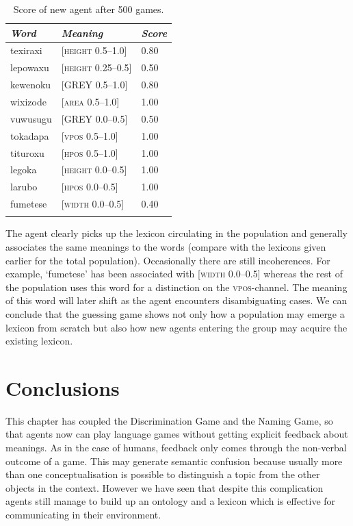 \begin{table}
\begin{center}
\begin{tabular}{ l  l  l }
\lsptoprule
{\itshape Word} & {\itshape Meaning} & {\itshape Score} \\ \midrule
texiraxi &  [\textsc{height} 0.5–1.0] & 0.80 \\ 
lepowaxu &  [\textsc{height} 0.25–0.5] & 0.50 \\ 
kewenoku &  [GREY 0.5–1.0] & 0.80 \\ 
wixizode & [\textsc{area} 0.5–1.0] & 1.00 \\ 
vuwusugu & [GREY 0.0–0.5] & 0.50 \\ 
tokadapa &  [\textsc{vpos} 0.5–1.0] & 1.00 \\ 
tituroxu &  [\textsc{hpos} 0.5–1.0] & 1.00 \\ 
legoka   &  [\textsc{height} 0.0–0.5] & 1.00 \\ 
larubo   &  [\textsc{hpos} 0.0–0.5] & 1.00 \\ 
fumetese &  [\textsc{width} 0.0–0.5] & 0.40 \\ 
\lspbottomrule
\end{tabular}
\caption{\label{tab:newagents}Score of new agent after 500 games.}
\end{center}
\end{table}
The agent clearly picks up the lexicon circulating
in the population and generally associates the 
same meanings to the words (compare with the 
lexicons given earlier for the total population). 
Occasionally there are still incoherences. For example, 
`fumetese' has been associated with [\textsc{width} 0.0–0.5] 
whereas the rest of the population uses this word
for a distinction on the \textsc{vpos}-channel. The meaning
of this word will later shift as the agent encounters
disambiguating cases. We can conclude that the 
guessing game shows not only how a population may 
emerge a lexicon from scratch but also how new 
agents entering the group may acquire the existing 
lexicon.  

\section{Conclusions}

This chapter has coupled the Discrimination Game and 
the Naming Game, so that agents now can play language
games without getting explicit feedback about meanings. 
As in the case of humans, feedback only comes through 
the non-verbal outcome of a game. 
This may generate semantic confusion
because usually more than one conceptualisation is 
possible to distinguish a topic from the other objects
in the context. However we have seen that despite
this complication agents still manage to build up 
an ontology and a lexicon which is effective for 
communicating in their environment. 

